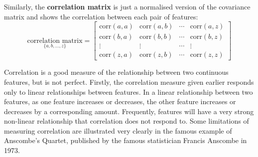 \documentclass[a4paper,11pt]{article}
\begin{document}
Similarly, the \textbf{correlation matrix} is just a normalised version of the covariance matrix and shows the correlation between each pair of features:
\[
    \underset{\{ a,b,\dots,z \}}{\text{correlation matrix}} =
    \begin{bmatrix}
        \text{corr}(a,a) & \text{corr}(a,b) & \cdots & \text{corr}(a,z) \\
        \text{corr}(b,a) & \text{corr}(b,b) & \cdots & \text{corr}(b,z) \\
        \vdots & \vdots & \cdots & \vdots \\
        \text{corr}(z,a) & \text{corr}(z,b) & \cdots & \text{corr}(z,z)
    \end{bmatrix}
\]

Correlation is a good measure of the relationship between two continuous features, but is not perfect.
Firstly, the correlation measure given earlier responds only to linear relationships between features.
In a linear relationship between two features, as one feature increases or decreases, the other feature increases or decreases by a corresponding amount.
Frequently, features will have a very strong non-linear relationship that correlation does not respond to.
Some limitations of measuring correlation are illustrated very clearly in the famous example of Anscombe's Quartet, published by the famous statistician Francis Anscombe in 1973.
\end{document}
